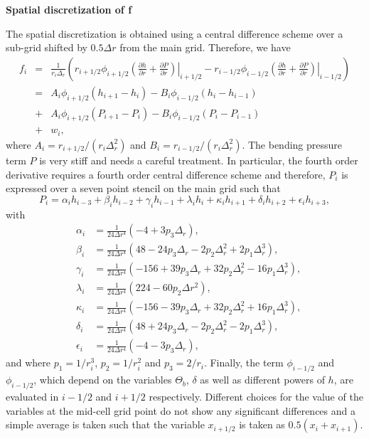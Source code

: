 \vspace{.5cm} \textbf{Spatial discretization of f} \vspace{.5cm}

The  spatial discretization  is  obtained using  a central  difference
scheme  over  a  sub-grid  shifted  by $0.5\Delta  r$  from  the  main
grid. Therefore, we have
\begin{eqnarray}
  f_i&=&\frac{1}{r_i \Delta_r}\left(r_{i+1/2}\phi_{i+1/2}\left.\left(\frac{\partial h}{\partial r}+\frac{\partial P}{\partial r}\right)\right|_{i+1/2}-r_{i-1/2}\phi_{i-1/2}\left.\left(\frac{\partial h}{\partial r}+\frac{\partial P}{\partial r}\right)\right|_{i-1/2}\right)\nonumber\\
     &=&A_i\phi_{i+1/2}\left(h_{i+1}-h_i\right)-B_i\phi_{i-1/2}\left(h_{i}-h_{i-1}\right)\nonumber\\
     &+&A_i\phi_{i+1/2}\left(P_{i+1}-P_i\right)-B_i\phi_{i-1/2}\left(P_{i}-P_{i-1}\right)\nonumber\\
     &+&w_i,\label{C4-Num-3}
\end{eqnarray}
where                $A_i=r_{i+1/2}/(r_i\Delta_r^2)$               and
$B_i=r_{i-1/2}/(r_i\Delta_r^2)$.   The bending  pressure  term $P$  is
very stiff and  needs a careful treatment.  In  particular, the fourth
order derivative requires a fourth order central difference scheme and
therefore, $P_i$ is  expressed over a seven point stencil  on the main
grid such that
\begin{equation}
  P_{i}=   \alpha_{i}h_{i-3}  +   \beta_{i}h_{i-2}+\gamma_{i}  h_{i-1}
  +\lambda_{i}h_{i}+\kappa_{i}h_{i+1}+\delta_ih_{i+2}+\epsilon_ih_{i+3},
  \label{C4-Num-4}
\end{equation}
with
\begin{eqnarray}
  &\alpha_{i}&=\frac{1}{24\Delta r^{4}}\left(-4+3p_3\Delta_r \right)\nonumber ,\\
  &\beta_{i}&=\frac{1}{24\Delta r^{4}}\left(48-24p_3\Delta_r-2p_2\Delta_r^2+2p_1\Delta_r^3\right) \nonumber,\\
  &\gamma_{i}&=\frac{1}{24\Delta r^{4}}\left(-156+39p_3\Delta_r+32p_2\Delta_r^2-16p_1\Delta_r^3\right)\nonumber,\\
  &\lambda_{i}&=\frac{1}{24\Delta r^{4}}\left(224-60p_2\Delta r^{2}\right) \nonumber,\\
  &\kappa_{i}&=\frac{1}{24\Delta r^{4}}\left( -156-39p_3\Delta_r+32p_2\Delta_r^2+16p_1\Delta_r^3\right)\nonumber,\\
  &\delta_{i}&=\frac{1}{24\Delta r^{4}}\left( 48+24p_3\Delta_r-2p_2\Delta_r^2-2p_1\Delta_r^3\right) \nonumber,\\
  &\epsilon_{i}&=\frac{1}{24\Delta r^{4}}\left(-4-3p_3\Delta_r \right),\nonumber
\end{eqnarray}
and where $p_1=1/r_i^3$, $p_2=1/r_i^2$ and $p_3 = 2/r_i$. Finally, the
term $\phi_{i-1/2}$ and $\phi_{i-1/2}$,  which depend on the variables
$\Theta_b$, $\delta$ as well as different powers of $h$, are evaluated
in $i-1/2$ and  $i+1/2$ respectively. Different choices  for the value
of  the  variables  at  the  mid-cell  grid  point  do  not  show  any
significant differences  and a simple  average is taken such  that the
variable $x_{i+1/2}$ is taken as $0.5(x_i+x_{i+1})$.

